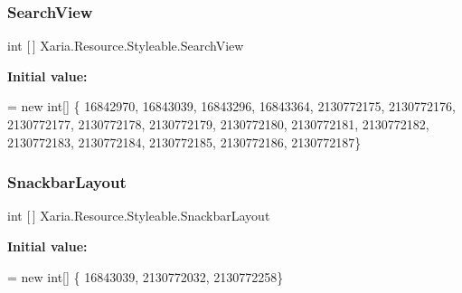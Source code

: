 \subsubsection{\texorpdfstring{Search\+View}{SearchView}}
{\footnotesize\ttfamily int \mbox{[}$\,$\mbox{]} Xaria.\+Resource.\+Styleable.\+Search\+View\hspace{0.3cm}{\ttfamily [static]}}

{\bfseries Initial value\+:}
\begin{DoxyCode}
= \textcolor{keyword}{new} \textcolor{keywordtype}{int}[] \{
                    16842970,
                    16843039,
                    16843296,
                    16843364,
                    2130772175,
                    2130772176,
                    2130772177,
                    2130772178,
                    2130772179,
                    2130772180,
                    2130772181,
                    2130772182,
                    2130772183,
                    2130772184,
                    2130772185,
                    2130772186,
                    2130772187\}
\end{DoxyCode}
\mbox{\label{classXaria_1_1Resource_1_1Styleable_a3621c1befb09d3bc1d7909a09bd53d72}} 
\subsubsection{\texorpdfstring{Snackbar\+Layout}{SnackbarLayout}}
{\footnotesize\ttfamily int \mbox{[}$\,$\mbox{]} Xaria.\+Resource.\+Styleable.\+Snackbar\+Layout\hspace{0.3cm}{\ttfamily [static]}}

{\bfseries Initial value\+:}
\begin{DoxyCode}
= \textcolor{keyword}{new} \textcolor{keywordtype}{int}[] \{
                    16843039,
                    2130772032,
                    2130772258\}
\end{DoxyCode}
\mbox{\label{classXaria_1_1Resource_1_1Styleable_a00a3f74e952cfcc66490a5d857371fbb}} 
